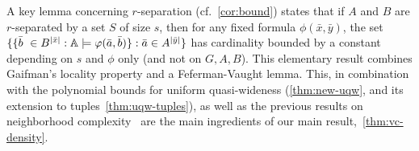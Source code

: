 A key lemma concerning $r$-separation (cf.~\cref{cor:bound}) states that if $A$
and $B$ are $r$-separated by a set $S$ of size $s$,
then for any fixed formula $\phi(\bar x,\bar y)$,
the set  $\{\{\bar{b}\ \in B^{|\bar x|} : \mathbb{A}\models\varphi(\bar{a},\bar{b})\} : \bar{a}\in A^{|\bar y|}\}$ has cardinality bounded by a constant depending on $s$ and $\phi$ only (and not on $G,A,B$). This elementary result combines  Gaifman's locality property and a Feferman-Vaught lemma. This, in combination with the polynomial bounds 
for uniform quasi-wideness (\cref{thm:new-uqw}, and its extension to tuples~\cref{thm:uqw-tuples}), as well as the previous results on neighborhood complexity~\cite{eickmeyer2016neighborhood,DrangeDFKLPPRVS16} are the main ingredients of our main result,~\cref{thm:vc-density}.

%
%
%
%

